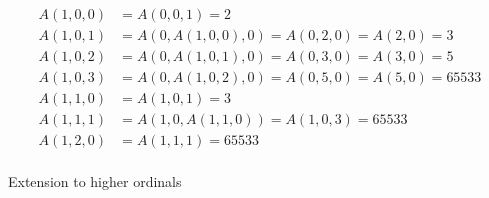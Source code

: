 \documentclass{article}
\begin{document}
\begin{align*}
  A(1, 0, 0) &= A(0, 0, 1) = 2 \\
  A(1, 0, 1) &= A(0, A(1, 0, 0), 0) = A(0, 2, 0) = A(2, 0) = 3 \\
  A(1, 0, 2) &= A(0, A(1, 0, 1), 0) = A(0, 3, 0) = A(3, 0) = 5 \\
  A(1, 0, 3) &= A(0, A(1, 0, 2), 0) = A(0, 5, 0) = A(5, 0) = 65533 \\
  A(1, 1, 0) &= A(1, 0, 1) = 3 \\
  A(1, 1, 1) &= A(1, 0, A(1, 1, 0)) = A(1, 0, 3) = 65533 \\
  A(1, 2, 0) &= A(1, 1, 1) = 65533 \\
\end{align*}

Extension to higher ordinals

\end{document}
